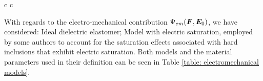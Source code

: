 \begin{table}[htbp!]
\begin{tabular}{c c}
\\
%
\midrule %
       
       
	\end{tabular}
%
	\caption{The various models used for the isothermal mechanical contribution $\Psi_{m}(\vect{F})$ in \eqref{eqn:additive decomposition}.}
	\label{table:mechanical potentials}
\end{table}


With regards to the electro-mechanical contribution $\Psi_{em}(\boldsymbol{F},\boldsymbol{E}_0)$, we have considered: Ideal dielectric elastomer; Model with electric saturation, employed by some authors to account for the saturation effects associated with hard inclusions that exhibit electric saturation. Both models and the material parameters used in their definition can be seen in Table \ref{table: electromechanical models}.


